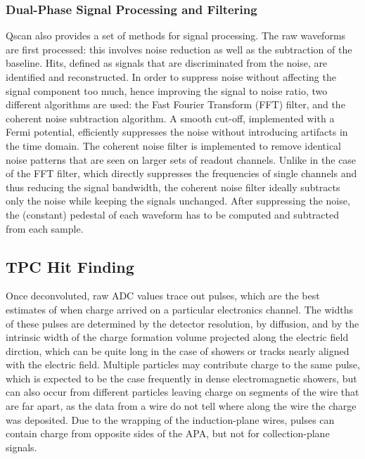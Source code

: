 \subsubsection{Dual-Phase Signal Processing and Filtering}

Qscan also provides a set of methods for signal processing. 
The raw waveforms are first processed: this involves noise reduction as well as the subtraction of the baseline.
Hits, defined as signals that are discriminated from the noise, are identified and reconstructed.
In order to suppress noise without affecting the signal component too much, hence improving the signal to noise ratio, 
two different algorithms are used: the Fast Fourier Transform (FFT) filter, and the coherent noise subtraction algorithm.
A smooth cut-off, implemented with a Fermi potential, efficiently suppresses the noise without introducing artifacts in the
time domain.
The coherent noise filter is implemented to remove identical noise patterns that are seen on larger sets of readout channels. 
Unlike in the case of the FFT filter, which directly suppresses the frequencies of single 
channels and thus reducing the signal bandwidth, the coherent noise filter ideally subtracts only the noise while keeping the signals unchanged.
After suppressing the noise, the (constant) pedestal of each waveform has to be computed and subtracted from each sample.

\subsection{TPC Hit Finding}
\label{annex:reconstruction-single-phase-hit-find}

Once deconvoluted, raw ADC values trace out pulses, which are the best
estimates of when charge arrived on a particular electronics channel.
The widths of these pulses are determined by the detector resolution,
by diffusion, and by the intrinsic width of the charge formation
volume projected along the electric field dirction, which can be quite
long in the case of showers or tracks nearly aligned with the electric
field.  Multiple particles may contribute charge to the same pulse,
which is expected to be the case frequently in dense electromagnetic
showers, but can also occur from different particles leaving charge on
segments of the wire that are far apart, as the data from a wire do
not tell where along the wire the charge was deposited.  
Due to the wrapping of the induction-plane wires, pulses can contain charge
from opposite sides of the APA, but not for collection-plane signals.

